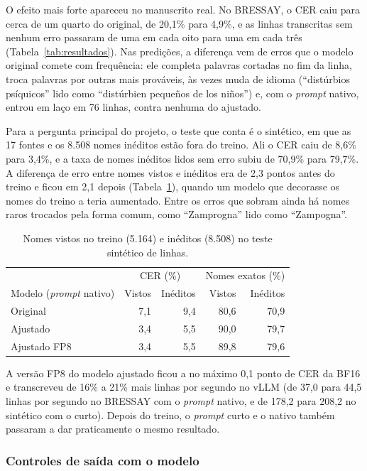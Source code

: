 \documentclass[12pt,a4paper]{article}
\begin{document}
O efeito mais forte apareceu no manuscrito real. No BRESSAY, o CER caiu para cerca de um quarto do original, de 20,1\% para 4,9\%, e as linhas transcritas sem nenhum erro passaram de uma em cada oito para uma em cada três (Tabela~\ref{tab:resultados}). Nas predições, a diferença vem de erros que o modelo original comete com frequência: ele completa palavras cortadas no fim da linha, troca palavras por outras mais prováveis, às vezes muda de idioma (``distúrbios psíquicos'' lido como ``distúrbien pequeños de los niños'') e, com o \emph{prompt} nativo, entrou em laço em 76 linhas, contra nenhuma do ajustado.

Para a pergunta principal do projeto, o teste que conta é o sintético, em que as 17 fontes e os 8.508 nomes inéditos estão fora do treino. Ali o CER caiu de 8,6\% para 3,4\%, e a taxa de nomes inéditos lidos sem erro subiu de 70,9\% para 79,7\%. A diferença de erro entre nomes vistos e inéditos era de 2,3 pontos antes do treino e ficou em 2,1 depois (Tabela~\ref{tab:memorizacao}), quando um modelo que decorasse os nomes do treino a teria aumentado. Entre os erros que sobram ainda há nomes raros trocados pela forma comum, como ``Zamprogna'' lido como ``Zampogna''.

\begin{table}[H]
\centering
\small
\begin{tabular}{@{}lrrrr@{}}
\toprule
& \multicolumn{2}{c}{CER (\%)} & \multicolumn{2}{c}{Nomes exatos (\%)} \\
Modelo (\emph{prompt} nativo) & Vistos & Inéditos & Vistos & Inéditos \\
\midrule
Original & 7,1 & 9,4 & 80,6 & 70,9 \\
Ajustado & 3,4 & 5,5 & 90,0 & 79,7 \\
Ajustado FP8 & 3,4 & 5,5 & 89,8 & 79,6 \\
\bottomrule
\end{tabular}
\caption{Nomes vistos no treino (5.164) e inéditos (8.508) no teste sintético de linhas.}
\label{tab:memorizacao}
\end{table}

A versão FP8 do modelo ajustado ficou a no máximo 0,1 ponto de CER da BF16 e transcreveu de 16\% a 21\% mais linhas por segundo no vLLM (de 37,0 para 44,5 linhas por segundo no BRESSAY com o \emph{prompt} nativo, e de 178,2 para 208,2 no sintético com o curto). Depois do treino, o \emph{prompt} curto e o nativo também passaram a dar praticamente o mesmo resultado.

\subsubsection{Controles de saída com o modelo}
\label{subsec:guard-modelo}
\end{document}
